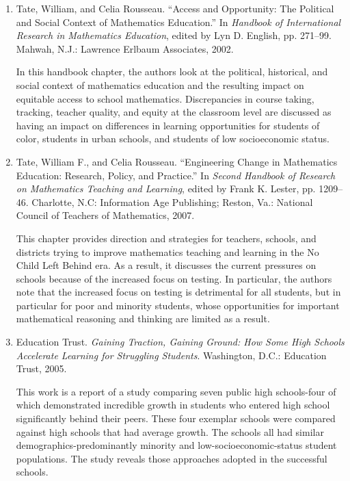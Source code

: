 \documentclass[
  10pt,
  a4paper,
  landscape,
  twoside,
  openany
]{scrbook}
\newcommand{\EN}[1]{#1}
\begin{document}
\TriPara
{
\EN{
  \begin{enumerate}
    \item Tate, William, and Celia Rousseau. ``Access and Opportunity: The Political and Social Context of Mathematics Education.'' In \emph{Handbook of International Research in Mathematics Education}, edited by Lyn D. English, pp. 271--99. Mahwah, N.J.: Lawrence Erlbaum Associates, 2002.

      In this handbook chapter, the authors look at the political, historical, and social context of mathematics education and the resulting impact on equitable access to school mathematics. Discrepancies in course taking, tracking, teacher quality, and equity at the classroom level are discussed as having an impact on differences in learning opportunities for students of color, students in urban schools, and students of low socioeconomic status.

    \item Tate, William F., and Celia Rousseau. ``Engineering Change in Mathematics Education: Research, Policy, and Practice.'' In \emph{Second Handbook of Research on Mathematics Teaching and Learning}, edited by Frank K. Lester, pp. 1209--46. Charlotte, N.C: Information Age Publishing; Reston, Va.: National Council of Teachers of Mathematics, 2007.

      This chapter provides direction and strategies for teachers, schools, and districts trying to improve mathematics teaching and learning in the No Child Left Behind era. As a result, it discusses the current pressures on schools because of the increased focus on testing. In particular, the authors note that the increased focus on testing is detrimental for all students, but in particular for poor and minority students, whose opportunities for important mathematical reasoning and thinking are limited as a result.

    \item Education Trust. \emph{Gaining Traction, Gaining Ground: How Some High Schools Accelerate Learning for Struggling Students}. Washington, D.C.: Education Trust, 2005.

      This work is a report of a study comparing seven public high schools-four of which demonstrated incredible growth in students who entered high school significantly behind their peers. These four exemplar schools were compared against high schools that had average growth. The schools all had similar demographics-predominantly minority and low-socioeconomic-status student populations. The study reveals those approaches adopted in the successful schools.


\end{enumerate}}}
\end{document}
